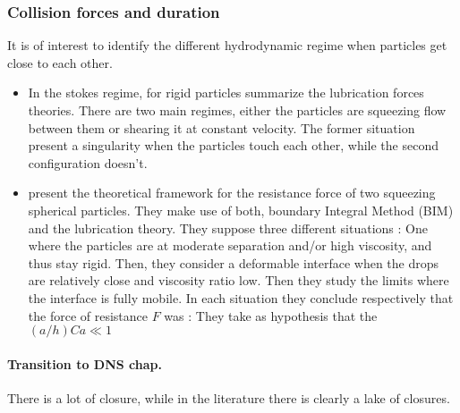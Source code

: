 \subsubsection{Collision forces and duration}
It is of interest to identify the different hydrodynamic regime when particles get close to each other.
\begin{itemize}
    \item In the stokes regime, for rigid particles \citep{guazzelli2011} summarize the lubrication forces theories.  
    There are two main regimes, either the particles  are squeezing flow between them or shearing  it at constant velocity. 
    The former situation present a singularity when the particles touch each other, while the second configuration doesn't. 
    \item \cite{davis1989lubrication} present the theoretical framework for the resistance force of two squeezing spherical particles.
    They make use of both, boundary Integral Method  (BIM) \citep{pozrikidis1992boundary} and the lubrication theory.   
    They suppose three different situations : One where the particles are at moderate separation and/or high viscosity, and thus stay rigid. Then, they consider a deformable interface when the drops are relatively close and viscosity ratio low. Then they study the limits where the interface is fully mobile.  
    In each situation they conclude respectively that the force of resistance $F$ was :
    They take as     hypothesis that the $(a/h) Ca\ll 1$
\end{itemize}


\paragraph*{Transition to DNS chap.} 
There is a lot of closure, while in the literature there is clearly a lake of closures. 